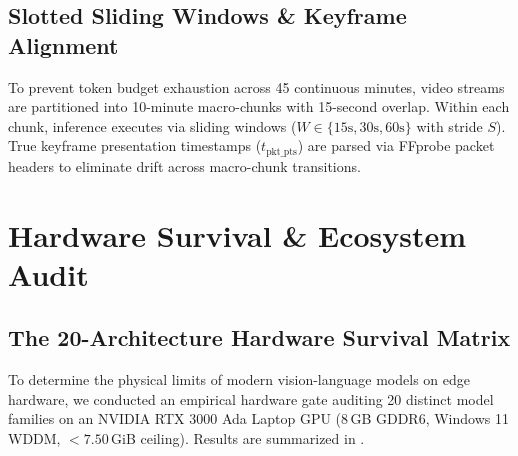 \documentclass[10pt,twocolumn,letterpaper]{article}
\begin{document}
\subsection{Slotted Sliding Windows \& Keyframe Alignment}
To prevent token budget exhaustion across 45 continuous minutes, video streams are partitioned into 10-minute macro-chunks with 15-second overlap. Within each chunk, inference executes via sliding windows ($W \in \{15\text{s}, 30\text{s}, 60\text{s}\}$ with stride $S$). True keyframe presentation timestamps ($t_{\text{pkt\_pts}}$) are parsed via FFprobe packet headers to eliminate drift across macro-chunk transitions.

\section{Hardware Survival \& Ecosystem Audit}
\label{sec:hardware}

\subsection{The 20-Architecture Hardware Survival Matrix}
To determine the physical limits of modern vision-language models on edge hardware, we conducted an empirical hardware gate auditing 20 distinct model families on an NVIDIA RTX 3000 Ada Laptop GPU (8\,GB GDDR6, Windows 11 WDDM, $<7.50$\,GiB ceiling). Results are summarized in .
\end{document}
